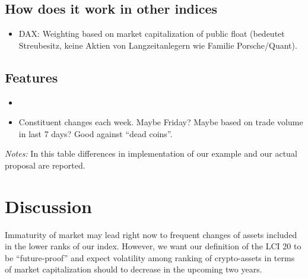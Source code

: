 \documentclass[11pt]{article}
\newcommand\fnotes[1]{\captionsetup{font=scriptsize}\caption*{\textsl{Notes:} #1}}
\begin{document}
\subsection{How does it work in other indices}

\begin{itemize}
  \item DAX: Weighting based on market capitalization of public float (bedeutet Streubesitz, keine Aktien von Langzeitanlegern  wie Familie Porsche/Quant).
\end{itemize}

\subsection{Features}

\begin{itemize}
  \item
  \item Constituent changes each week. Maybe Friday? Maybe based on trade volume in last 7 days? Good against ``dead coins''.
\end{itemize}

\begin{table*}
\caption{Table explaining differences: proposal vs.\ example}
\centering
{}
\fnotes{In this table differences in implementation of our example and our actual proposal are reported.}
\end{table*}

\section{Discussion}

Immaturity of market may lead right now to frequent changes of assets included in the lower ranks of our index.
However, we want our definition of the LCI 20 to be ``future-proof'' and expect volatility among ranking of crypto-assets in terms of market capitalization should to decrease in the upcoming two years.
\end{document}
